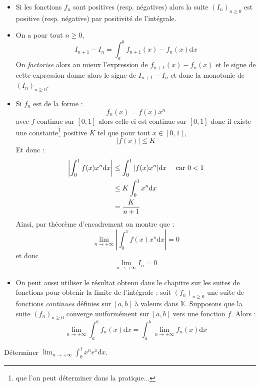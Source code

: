 \documentclass[french,11pt,twoside]{VcCours}
\newcommand{\dx}{\text{d}x}
\begin{document}
\begin{itemize}
\item Si les fonctions $f_n$ sont positives (resp. négatives) alors la suite $(I_n)_{n \geq 0}$ est positive (resp. négative) par positivité de l'intégrale.
\item On a pour tout $n \geq 0$,
$$ I_{n+1}-I_n = \int_{a}^b f_{n+1}(x)-f_n(x) \dx$$
On \textit{factorise} alors au mieux l'expression de $f_{n+1}(x)-f_n(x)$ et le signe de cette expression donne alors le signe de $I_{n+1}-I_n$ et donc la monotonie de $(I_n)_{n \geq 0}$.
\item Si $f_n$ est de la forme :
$$ f_n(x) = f(x) x^n$$
avec $f$ continue sur $[0,1]$ alors celle-ci est continue sur $[0,1]$ donc il existe une constante\footnote{que l'on peut déterminer dans la pratique...} positive $K$ tel que pour tout $x \in [0,1]$,
$$ \vert f(x) \vert \leq K$$
Et donc :
\begin{align*}
\left\vert \int_{0}^1 f(x) x^n \dx \right\vert & \leq \int_{0}^1 \vert f(x)x^n \vert \dx \quad \hbox{ car } 0<1 \\
& \leq K \int_{0}^1 x^n \dx \\
& = \dfrac{K}{n+1} 
\end{align*}
Ainsi, par théorème d'encadrement on montre que :
$$ \lim_{n \rightarrow + \infty} \left\vert \int_{0}^1 f(x) x^n \dx \right\vert = 0 $$
et donc 
$$ \lim_{n \rightarrow + \infty} I_n = 0 $$
\item On peut aussi utiliser le résultat obtenu dans le chapitre sur les suites de fonctions pour obtenir la limite de l'intégrale :  soit $(f_n)_{n \geq 0}$ une suite de fonctions \textit{continues} définies sur $[a,b]$ à valeurs dans $\mathbb{K}$. Supposons que la suite $(f_n)_{n \geq 0}$ converge uniformément sur $[a,b]$ vers une fonction $f$. Alors :
$$ \lim_{n \rightarrow + \infty} \int_{a}^b f_n(x) \dx = \int_{a}^b \lim_{n \rightarrow + \infty} f_n(x) \dx$$

\end{itemize}

\begin{ApplicationDirecte}{} Déterminer $\lim_{n \rightarrow + \infty} \int_{0}^1 x^n e^{x} \dx$.
\end{ApplicationDirecte}
\end{document}
